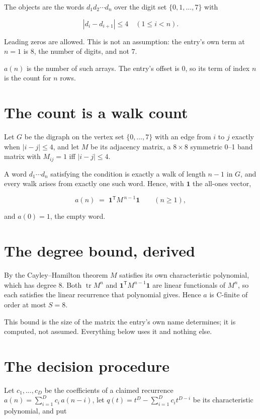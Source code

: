 \documentclass[11pt]{article}
\theoremstyle{definition}
\begin{document}
The objects are the words $d_1 d_2 \cdots d_n$ over the digit set $\{0,1,\dots,7\}$ with

\[|d_i - d_{i+1}| \le 4\quad (1 \le i < n).\]

Leading zeros are allowed. This is not an assumption: the entry's own term at $n=1$ is $8$, the number of digits, and not $7$.

$a(n)$ is the number of such arrays. The entry's offset is 0, so its term of index $n$ is the count for $n$ rows.

\section{The count is a walk count}

Let $G$ be the digraph on the vertex set $\{0,\dots,7\}$ with an edge from $i$ to $j$ exactly when $|i-j| \le 4$, and let $M$ be its adjacency matrix, a $8 \times 8$ symmetric 0--1 band matrix with $M_{ij} = 1$ iff $|i-j| \le 4$.

A word $d_1\cdots d_n$ satisfying the condition is exactly a walk of length $n-1$ in $G$, and every walk arises from exactly one such word. Hence, with $\mathbf 1$ the all-ones vector,

\[a(n) \;=\; \mathbf 1^{\mathsf T} M^{\,n-1} \mathbf 1 \qquad (n \ge 1),\]

and $a(0) = 1$, the empty word.

\section{The degree bound, derived}

By the Cayley--Hamilton theorem $M$ satisfies its own characteristic polynomial, which has degree $8$. Both $\operatorname{tr} M^n$ and $\mathbf 1^{\mathsf T} M^{n-1} \mathbf 1$ are linear functionals of $M^{n}$, so each satisfies the linear recurrence that polynomial gives. Hence $a$ is C-finite of order at most $S = 8$.

This bound is the size of the matrix the entry's own name determines; it is computed, not assumed. Everything below uses it and nothing else.

\section{The decision procedure}

Let $c_1,\dots,c_D$ be the coefficients of a claimed recurrence $a(n) = \sum_{i=1}^{D} c_i\,a(n-i)$, let $q(t) = t^{D} - \sum_{i=1}^{D} c_i t^{D-i}$ be its characteristic polynomial, and put
\end{document}
